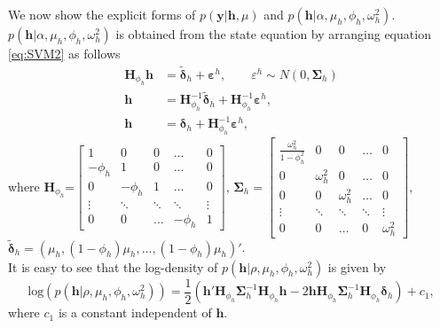 \documentclass[11pt]{article}
\newcommand{\beq}{\begin{equation}}
\newcommand{\eeq}{\end{equation}}
\newcommand{\bbmatrix}{\begin{bmatrix}}
\newcommand{\ebmatrix}{\end{bmatrix}}
\numberwithin{equation}{section}
\begin{document}
We now show the explicit forms of  $p(\mathbf{y}|\mathbf{h}, \mu)$ and $p(\mathbf{h}| \alpha, \mu_h, \phi_h, \omega^2_h)$. $p(\mathbf{h}| \alpha, \mu_h, \phi_h, \omega^2_h)$ is obtained from the state equation by arranging equation \eqref{eq:SVM2} as follows
\begin{align}
\mathbf{H}_{\phi_h} \mathbf{h} &=\tilde{\pmb{\delta}}_h +\pmb{\varepsilon}^h,  \qquad \varepsilon^h \sim N(0, \pmb{\Sigma}_h)\nonumber \\
\mathbf{h}&=\mathbf{H}^{-1}_{\phi_h} \tilde{\pmb{\delta}}_h+\mathbf{H}^{-1}_{\phi_h}\pmb{\varepsilon}^h, \nonumber \\
\mathbf{h}&=\pmb{\delta}_h+\mathbf{H}^{-1}_{\phi_h}\pmb{\varepsilon}^h, \nonumber
\end{align}
where $\mathbf{H}_{\phi_h}$=$\bbmatrix 1 & 0 & 0 &\ldots &0\\
-\phi_h &1 & 0 & \ldots & 0 \\
0 & -\phi_h & 1 & \ldots & 0 \\
\vdots & \ddots & \ddots& \ddots & \vdots \\
0 & 0 & \ldots & -\phi_h & 1 \ebmatrix $, $\pmb{\Sigma}_h=\bbmatrix \frac{\omega^2_h}{1-\phi^2_h} & 0 & 0 &\ldots &0\\
0&\omega^2_h & 0 & \ldots & 0 \\
0 & 0 & \omega^2_h & \ldots & 0 \\
\vdots & \ddots & \ddots& \ddots & \vdots\\
0 & 0 & \ldots & 0& \omega^2_h\ebmatrix $,\\ $\pmb{\tilde{\delta}}_h=(\mu_h, (1-\phi_h)\mu_h,\ldots, (1-\phi_h)\mu_h)'$. \\
It is easy to see that the log-density of $p(\mathbf{h}| \rho, \mu_h, \phi_h, \omega^2_h)$ is given by
\beq
\text{log}( p(\mathbf{h}| \rho, \mu_h, \phi_h, \omega^2_h))=\frac{1}{2} (\mathbf{h}'\mathbf{H}_{\phi_h} \pmb{\Sigma}_h^{-1}\mathbf{H}_{\phi_h} \mathbf{h}-2\mathbf{h}\mathbf{H}_{\phi_h} \mathbf{\Sigma}_h^{-1}\mathbf{H}_{\phi_h}\pmb{\delta}_h )+c_1, \label{eq:priorh}
\eeq 
where $c_1$ is a constant independent of $\mathbf{h}$.\\
\end{document}
